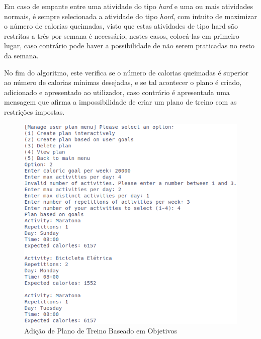 \documentclass[a4paper,12pt]{scrreprt}
\begin{document}
    Em caso de empante entre uma atividade do tipo \textit{hard} e uma ou mais atividades normais,
    é sempre selecionada a atividade do tipo \textit{hard}, com intuito de maximizar o número de calorias queimadas,
    visto que estas atividades de tipo hard são restritas a três por semana é necessário, nestes casos, colocá-las em primeiro
    lugar, caso contrário pode haver a possibilidade de não serem praticadas no resto da semana.

    No fim do algoritmo, este verifica se o número de calorias queimadas é superior ao número de calorias mínimas desejadas,
    e se tal acontecer o plano é criado, adicionado e apresentado ao utilizador, caso contrário é apresentada uma mensagem que
    afirma a impossibilidade de criar um plano de treino com as restrições impostas.

    \begin{figure}[!ht]
        \centering
        \includegraphics[width=\textwidth]{images/createPlanGoals1.png}
        \caption{Adição de Plano de Treino Baseado em Objetivos}
        \label{fig:add-plan-goals-1}
    \end{figure}
\end{document}
